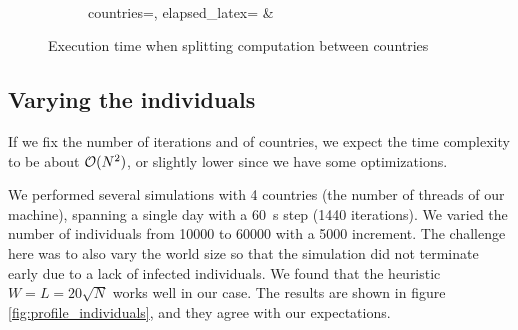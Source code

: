 \begin{figure}[p]
    \begin{subfigure}[c]{.6\textwidth}
    \end{subfigure}
    ~
    \begin{subfigure}[c]{.35\textwidth}
        {countries=\countries, elapsed_latex=\elapsed}%
        {\countries & \elapsed}
    \end{subfigure}
    \caption{Execution time when splitting computation between countries}
    \label{fig:profile_countries}
\end{figure}

\subsection{Varying the individuals}
If we fix the number of iterations and of countries, we expect the time complexity to be about $\mathcal{O}(N^2)$, or slightly lower since we have some optimizations.

We performed several simulations with 4 countries (the number of threads of our machine), spanning a single day with a \SI{60}{s} step (1440 iterations). We varied the number of individuals from \num{10000} to \num{60000} with a \num{5000} increment. The challenge here was to also vary the world size so that the simulation did not terminate early due to a lack of infected individuals. We found that the heuristic $W = L = 20 \sqrt{N}$ works well in our case. The results are shown in figure \ref{fig:profile_individuals}, and they agree with our expectations.

